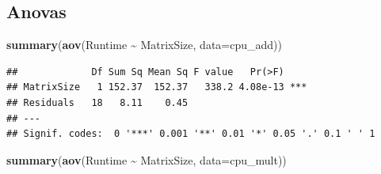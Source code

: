 \documentclass[
]{article}
\newenvironment{Shaded}{\begin{snugshade}}{\end{snugshade}}
\newcommand{\DataTypeTok}[1]{\textcolor[rgb]{0.13,0.29,0.53}{#1}}
\newcommand{\DecValTok}[1]{\textcolor[rgb]{0.00,0.00,0.81}{#1}}
\newcommand{\KeywordTok}[1]{\textcolor[rgb]{0.13,0.29,0.53}{\textbf{#1}}}
\newcommand{\NormalTok}[1]{#1}
\newcommand{\OperatorTok}[1]{\textcolor[rgb]{0.81,0.36,0.00}{\textbf{#1}}}
\newcommand{\StringTok}[1]{\textcolor[rgb]{0.31,0.60,0.02}{#1}}
\begin{document}
\begin{Shaded}
\end{Shaded}

\hypertarget{anovas}{%
\subsection{Anovas}\label{anovas}}

\begin{Shaded}
\begin{Highlighting}[]
\KeywordTok{summary}\NormalTok{(}\KeywordTok{aov}\NormalTok{(Runtime }\OperatorTok{\textasciitilde{}}\StringTok{ }\NormalTok{MatrixSize, }\DataTypeTok{data=}\NormalTok{cpu\_add))}
\end{Highlighting}
\end{Shaded}

\begin{verbatim}
##             Df Sum Sq Mean Sq F value   Pr(>F)    
## MatrixSize   1 152.37  152.37   338.2 4.08e-13 ***
## Residuals   18   8.11    0.45                     
## ---
## Signif. codes:  0 '***' 0.001 '**' 0.01 '*' 0.05 '.' 0.1 ' ' 1
\end{verbatim}

\begin{Shaded}
\begin{Highlighting}[]
\KeywordTok{summary}\NormalTok{(}\KeywordTok{aov}\NormalTok{(Runtime }\OperatorTok{\textasciitilde{}}\StringTok{ }\NormalTok{MatrixSize, }\DataTypeTok{data=}\NormalTok{cpu\_mult))}
\end{Highlighting}
\end{Shaded}
\end{document}
